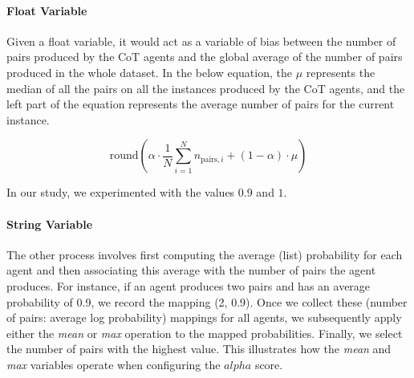\documentclass[11pt]{article}
\begin{document}
\paragraph{Float Variable}
Given a float variable, it would act as a variable of bias between the number of pairs produced by the CoT agents and the global average of the number of pairs produced in the whole dataset. In the below equation, the $\mu$ represents the median of all the pairs on all the instances produced by the CoT agents, and the left part of the equation represents the average number of pairs for the current instance.


\[
\text{round} \left( \alpha \cdot \frac{1}{N} \sum_{i=1}^{N} n_{\text{pairs}, i} + (1 - \alpha) \cdot \mu \right)
\]

In our study, we experimented with the values $0.9$ and $1$.

\paragraph{String Variable}

The other process involves first computing the average (list) probability for each agent and then associating this average with the number of pairs the agent produces. For instance, if an agent produces two pairs and has an average probability of 0.9, we record the mapping (2, 0.9). Once we collect these (number of pairs: average log probability) mappings for all agents, we subsequently apply either the \textit{mean} or \textit{max} operation to the mapped probabilities. Finally, we select the number of pairs with the highest value. This illustrates how the \textit{mean} and \textit{max} variables operate when configuring the $alpha$ score.
\end{document}

